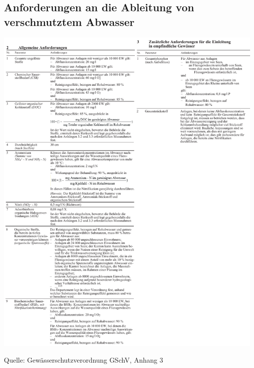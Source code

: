 \documentclass[9pt, openright=false]{scrartcl}
\begin{document}
\subsection{Anforderungen an die Ableitung von verschmutztem
Abwasser}
\begin{center}
\includegraphics[width=1.00\textwidth]{images/anhgschv}
\end{center}
\begin{small}
Quelle: Gewässerschutzverordnung GSchV, Anhang 3
\end{small}
\end{document}
